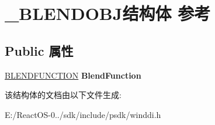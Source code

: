 \hypertarget{struct___b_l_e_n_d_o_b_j}{}\section{\+\_\+\+B\+L\+E\+N\+D\+O\+B\+J结构体 参考}
\label{struct___b_l_e_n_d_o_b_j}
\subsection*{Public 属性}
\begin{DoxyCompactItemize}
\item 
\mbox{\label{struct___b_l_e_n_d_o_b_j_ad5d696e47f5b661dc458f6b851db6e1b}} 
\hyperlink{struct___b_l_e_n_d_f_u_n_c_t_i_o_n}{B\+L\+E\+N\+D\+F\+U\+N\+C\+T\+I\+ON} {\bfseries Blend\+Function}
\end{DoxyCompactItemize}


该结构体的文档由以下文件生成\+:\begin{DoxyCompactItemize}
\item 
E\+:/\+React\+O\+S-\/0../sdk/include/psdk/winddi.\+h\end{DoxyCompactItemize}
